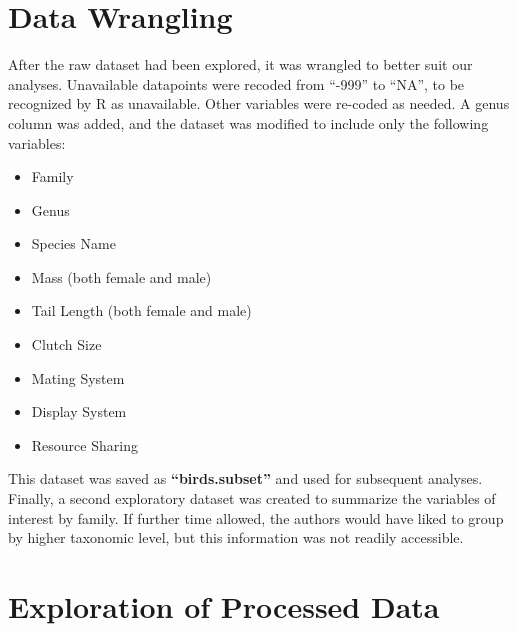\documentclass[
  12pt,
]{article}
\providecommand{\tightlist}{%
  \setlength{\itemsep}{0pt}\setlength{\parskip}{0pt}}
\begin{document}
\newpage

\hypertarget{data-wrangling}{%
\section{Data Wrangling}\label{data-wrangling}}

After the raw dataset had been explored, it was wrangled to better suit
our analyses. Unavailable datapoints were recoded from ``-999'' to
``NA'', to be recognized by R as unavailable. Other variables were
re-coded as needed. A genus column was added, and the dataset was
modified to include only the following variables:

\begin{itemize}
\tightlist
\item
  Family
\item
  Genus
\item
  Species Name
\item
  Mass (both female and male)
\item
  Tail Length (both female and male)
\item
  Clutch Size
\item
  Mating System
\item
  Display System
\item
  Resource Sharing
\end{itemize}

This dataset was saved as \textbf{``birds.subset''} and used for
subsequent analyses. Finally, a second exploratory dataset was created
to summarize the variables of interest by family. If further time
allowed, the authors would have liked to group by higher taxonomic
level, but this information was not readily accessible.

\newpage

\hypertarget{exploration-of-processed-data}{%
\section{Exploration of Processed
Data}\label{exploration-of-processed-data}}
\end{document}
